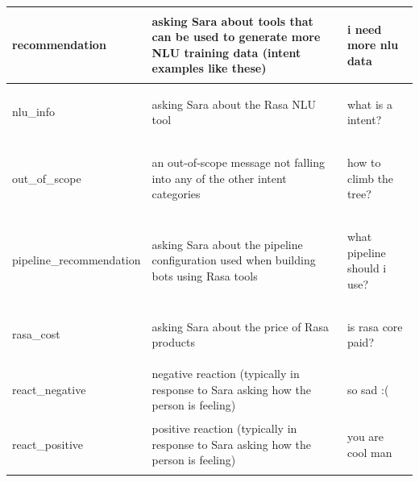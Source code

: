 \documentclass[bsc,frontabs,singlespacing,parskip,deptreport]{infthesis}
\begin{document}
{\begin{center}
\begin{longtable}{p{}|p{}|p{}}
\begin{spverbatim}
    recommendation\end{spverbatim} & asking Sara about tools that can be used to generate more NLU training data (intent examples like these) & \begin{spverbatim}i need more nlu data\end{spverbatim} \\
    \hline
    \begin{spverbatim}nlu_info\end{spverbatim} & asking Sara about the Rasa NLU tool & \begin{spverbatim}what is a intent?\end{spverbatim} \\
    \hline
    \begin{spverbatim}out_of_scope\end{spverbatim} & an out-of-scope message not falling into any of the other intent categories & \begin{spverbatim}how to climb the tree?\end{spverbatim} \\
    \hline
    \begin{spverbatim}pipeline_recommendation\end{spverbatim} & asking Sara about the pipeline configuration used when building bots using Rasa tools & \begin{spverbatim}what pipeline should i use?\end{spverbatim} \\
    \hline
    \begin{spverbatim}rasa_cost\end{spverbatim} & asking Sara about the price of Rasa products & \begin{spverbatim}is rasa core paid?\end{spverbatim} \\
    \hline
    \begin{spverbatim}react_negative\end{spverbatim} & negative reaction (typically in response to Sara asking how the person is feeling) & \begin{spverbatim}so sad :(\end{spverbatim} \\
    \hline
    \begin{spverbatim}react_positive\end{spverbatim} & positive reaction (typically in response to Sara asking how the person is feeling) & \begin{spverbatim}you are cool man\end{spverbatim} \\

\end{longtable}
\end{center}}
\end{document}
